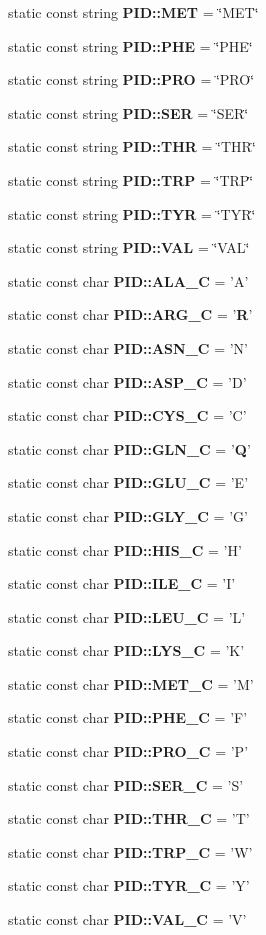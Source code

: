 \begin{CompactItemize}
\item 
static const string {\bf PID::MET} = \char`\"{}MET\char`\"{}
\item 
static const string {\bf PID::PHE} = \char`\"{}PHE\char`\"{}
\item 
static const string {\bf PID::PRO} = \char`\"{}PRO\char`\"{}
\item 
static const string {\bf PID::SER} = \char`\"{}SER\char`\"{}
\item 
static const string {\bf PID::THR} = \char`\"{}THR\char`\"{}
\item 
static const string {\bf PID::TRP} = \char`\"{}TRP\char`\"{}
\item 
static const string {\bf PID::TYR} = \char`\"{}TYR\char`\"{}
\item 
static const string {\bf PID::VAL} = \char`\"{}VAL\char`\"{}
\item 
static const char {\bf PID::ALA\_\-C} = 'A'
\item 
static const char {\bf PID::ARG\_\-C} = '{\bf R}'
\item 
static const char {\bf PID::ASN\_\-C} = 'N'
\item 
static const char {\bf PID::ASP\_\-C} = 'D'
\item 
static const char {\bf PID::CYS\_\-C} = 'C'
\item 
static const char {\bf PID::GLN\_\-C} = '{\bf Q}'
\item 
static const char {\bf PID::GLU\_\-C} = 'E'
\item 
static const char {\bf PID::GLY\_\-C} = 'G'
\item 
static const char {\bf PID::HIS\_\-C} = 'H'
\item 
static const char {\bf PID::ILE\_\-C} = 'I'
\item 
static const char {\bf PID::LEU\_\-C} = 'L'
\item 
static const char {\bf PID::LYS\_\-C} = 'K'
\item 
static const char {\bf PID::MET\_\-C} = 'M'
\item 
static const char {\bf PID::PHE\_\-C} = 'F'
\item 
static const char {\bf PID::PRO\_\-C} = 'P'
\item 
static const char {\bf PID::SER\_\-C} = 'S'
\item 
static const char {\bf PID::THR\_\-C} = 'T'
\item 
static const char {\bf PID::TRP\_\-C} = 'W'
\item 
static const char {\bf PID::TYR\_\-C} = 'Y'
\item 
static const char {\bf PID::VAL\_\-C} = 'V'
\end{CompactItemize}


